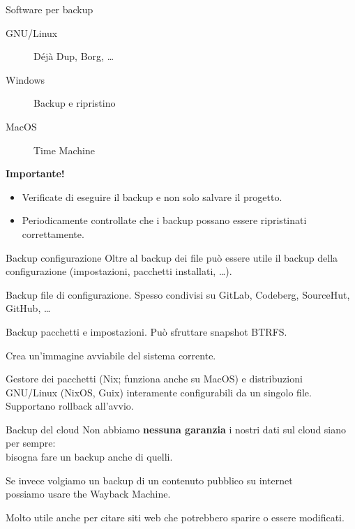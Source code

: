 \begin{myframe}{Software per backup}
  \begin{description}
    \item[GNU/Linux] Déjà Dup, Borg, \dots
    \item[Windows] Backup e ripristino
    \item[MacOS] Time Machine
  \end{description}
  \pause\bigskip

  \textbf{Importante!}
  \begin{itemize}[<+->]
    \item Verificate di eseguire il backup e non solo salvare il progetto.
    \item Periodicamente controllate che i backup possano essere ripristinati correttamente.
  \end{itemize}
\end{myframe}

\begin{myframe}{Backup configurazione}
  Oltre al backup dei file può essere utile il backup della configurazione (impostazioni, pacchetti installati, \dots).
  \begin{description}[<+->]
    \item[dotfiles] Backup file di configurazione. Spesso condivisi su GitLab, Codeberg, SourceHut, GitHub, \dots
    \item[Timeshift] Backup pacchetti e impostazioni. Può sfruttare snapshot BTRFS.
    \item[MxLinux snapshot] Crea un'immagine avviabile del sistema corrente.
    \item[Nix, NixOs, Guix] Gestore dei pacchetti (Nix; funziona anche su MacOS) e distribuzioni GNU/Linux (NixOS, Guix) interamente configurabili da un singolo file. Supportano rollback all'avvio.
  \end{description}
\end{myframe}

\begin{myframe}{Backup del cloud}
  Non abbiamo \textbf{nessuna garanzia} i nostri dati sul cloud siano per sempre:\\bisogna fare un backup anche di quelli.

  \pause\bigskip\bigskip

  Se invece volgiamo un backup di un contenuto pubblico su internet\\possiamo usare the Wayback Machine.

  Molto utile anche per citare siti web che potrebbero sparire o essere modificati.
\end{myframe}

